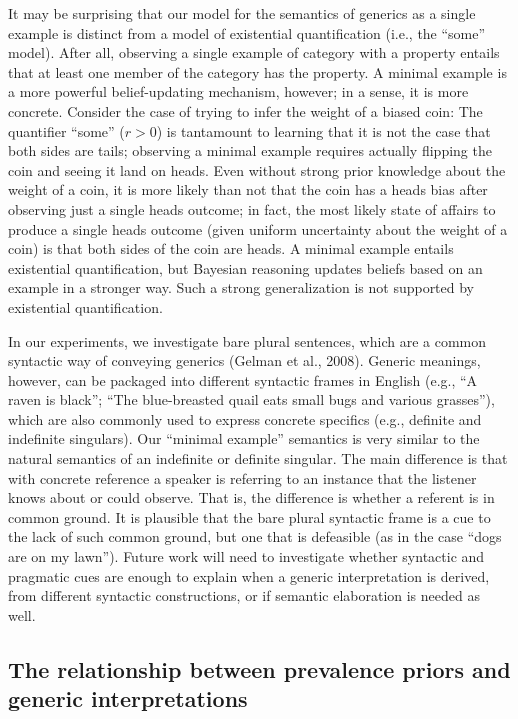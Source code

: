 \documentclass[floatsintext,doc]{apa6}
\newcommand{\mht}[1]{{\textcolor{Blue}{[mht: #1]}}}
\begin{document}
It may be surprising that our model for the semantics of generics as a single example is distinct from a model of existential quantification (i.e., the ``some'' model). 
After all, observing a single example of category with a property entails that at least one member of the category has the property. 
A minimal example is a more powerful belief-updating mechanism, however; in a sense, it is more concrete. 
Consider the case of trying to infer the weight of a biased coin: The quantifier ``some'' ($r > 0$) is tantamount to learning that it is not the case that both sides are tails; observing a minimal example requires actually flipping the coin and seeing it land on heads. 
Even without strong prior knowledge about the weight of a coin, it is more likely than not that the coin has a heads bias after observing just a single heads outcome; in fact, the most likely state of affairs to produce a single heads outcome (given uniform uncertainty about the weight of a coin) is that both sides of the coin are heads.
A minimal example entails existential quantification, but Bayesian reasoning updates beliefs based on an example in a stronger way.
Such a strong generalization is not supported by existential quantification.

In our experiments, we investigate bare plural sentences, which are a common syntactic way of conveying generics (Gelman et al., 2008).
Generic meanings, however, can be packaged into different syntactic frames in English (e.g., ``A raven is black''; ``The blue-breasted quail eats small bugs and various grasses''), which are also commonly used to express concrete specifics (e.g., definite and indefinite singulars). 
Our ``minimal example'' semantics is very similar to the natural semantics of an indefinite or definite singular.
The main difference is that with concrete reference a speaker is referring to an instance that the listener knows about or could observe. 
That is, the difference is whether a referent is in common ground.
It is plausible that the bare plural syntactic frame is a cue to the lack of such common ground, but one that is defeasible (as in the case ``dogs are on my lawn'').
Future work will need to investigate whether syntactic and pragmatic cues are enough to explain when a generic interpretation is derived, from different syntactic constructions, or if semantic elaboration is needed as well.

\hypertarget{the-relationship-between-prevalence-priors-and-generic-interpretations}{%
\subsection{The relationship between prevalence priors and generic interpretations}\label{the-relationship-between-prevalence-priors-and-generic-interpretations}}
\end{document}
